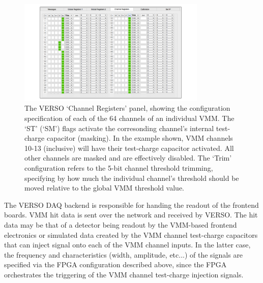 \begin{figure}[!htb]
    \begin{center}
        \includegraphics[width=0.8\textwidth]{figures/nsw/vrs/verso_chanreg}
        \caption{
            The VERSO `Channel Registers' panel, showing the configuration specification
            of each of the 64 channels of an individual VMM.
            The `ST' (`SM') flags activate the corresonding channel's internal test-charge
            capacitor (masking).
            In the example shown, VMM channels 10-13 (inclusive) will have their
            test-charge capacitor activated. All other channels are masked and
            are effectively disabled.
            The `Trim' configuration refers to the 5-bit channel threshold trimming,
            specifying by how much the individual channel's threshold should be moved
            relative to the global VMM threshold value.
        }
        \label{fig:verso_chanreg}
    \end{center}
\end{figure}

The VERSO DAQ backend is responsible for handing the readout of the frontend boards.
VMM hit data is sent over the network and received by VERSO.
The hit data may be that of a detector being readout by the VMM-based frontend electronics
or simulated data created by the VMM channel test-charge capacitors that can inject
signal onto each of the VMM channel inputs.
In the latter case, the frequency and characteristics (width, amplitude, etc...) of the
signals are specified via the FPGA configuration described above, since the FPGA orchestrates
the triggering of the VMM channel test-charge injection signals.

